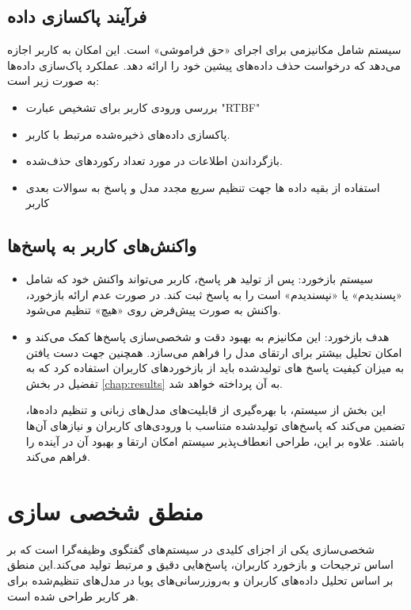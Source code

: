 \begin{enumerate}
\subsection{فرآیند پاکسازی داده}

سیستم شامل مکانیزمی برای اجرای «حق فراموشی» است. این امکان به کاربر اجازه می‌دهد که درخواست حذف داده‌های پیشین خود را ارائه دهد. عملکرد پاک‌سازی داده‌ها به صورت زیر است:
\begin{itemize}
\item
بررسی ورودی کاربر برای تشخیص عبارت "RTBF"
\item
پاکسازی داده‌های ذخیره‌شده مرتبط با کاربر.
\item
بازگرداندن اطلاعات در مورد تعداد رکوردهای حذف‌شده.
\item
استفاده از بقیه داده ها جهت تنظیم سریع مجدد مدل و پاسخ به سوالات بعدی کاربر
\end{itemize}




\subsection{واکنش‌های کاربر به پاسخ‌ها}

\begin{itemize}
\item
سیستم بازخورد: پس از تولید هر پاسخ، کاربر می‌تواند واکنش خود که شامل «پسندیدم» یا «نپسندیدم» است را به پاسخ ثبت کند. در صورت عدم ارائه بازخورد، واکنش به صورت پیش‌فرض روی «هیچ» تنظیم می‌شود.
\item
هدف بازخورد: این مکانیزم به بهبود دقت و شخصی‌سازی پاسخ‌ها کمک می‌کند و امکان تحلیل بیشتر برای ارتقای مدل را فراهم می‌سازد. همچنین جهت دست یافتن به میزان کیفیت پاسخ های تولیدشده باید از بازخوردهای کاربران استفاده کرد که به تفضیل در بخش%
\ref{chap:results}
 به آن پرداخته خواهد شد.


این بخش از سیستم، با بهره‌گیری از قابلیت‌های مدل‌های زبانی و تنظیم داده‌ها، تضمین می‌کند که پاسخ‌های تولیدشده متناسب با ورودی‌های کاربران و نیازهای آن‌ها باشند. علاوه بر این، طراحی انعطاف‌پذیر سیستم امکان ارتقا و بهبود آن در آینده را فراهم می‌کند.
\end{itemize}

\section{منطق شخصی سازی}
 
شخصی‌سازی یکی از اجزای کلیدی در سیستم‌های گفتگوی وظیفه‌گرا است که بر اساس ترجیحات و بازخورد کاربران، پاسخ‌هایی دقیق و مرتبط تولید می‌کند.این منطق بر اساس تحلیل داده‌های کاربران و به‌روزرسانی‌های پویا در مدل‌های تنظیم‌شده برای هر کاربر طراحی شده است.


\end{enumerate}
